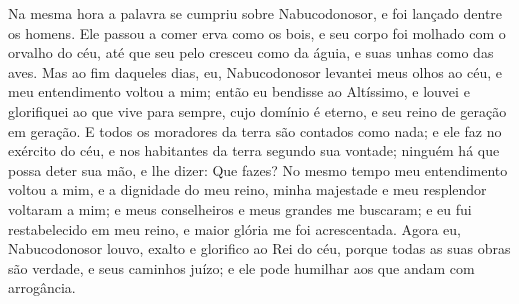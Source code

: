 {Na mesma hora a palavra se cumpriu sobre Nabucodonosor, e foi lançado dentre os homens. Ele passou a comer erva como os bois, e seu corpo foi molhado com o orvalho do céu, até que seu pelo cresceu como
{} da águia, e suas unhas como
{} das aves.
Mas ao fim daqueles dias, eu, Nabucodonosor levantei meus olhos ao céu, e meu entendimento voltou a mim; então eu bendisse ao Altíssimo, e louvei e glorifiquei ao que vive para sempre, cujo domínio é eterno, e seu reino de geração em geração.
E todos os moradores da terra são contados como nada; e ele faz no exército do céu, e nos habitantes da terra segundo sua vontade; ninguém há que possa deter
 sua mão, e lhe dizer: Que fazes?
No mesmo tempo meu entendimento voltou a mim, e a dignidade do meu reino, minha majestade e meu resplendor voltaram a mim; e meus conselheiros e meus grandes me buscaram; e eu fui restabelecido em meu reino, e maior glória me foi acrescentada.
Agora eu, Nabucodonosor louvo, exalto e glorifico ao Rei do céu, porque todas as suas obras são verdade, e seus caminhos juízo; e ele pode humilhar aos que andam com arrogância.

\par }

